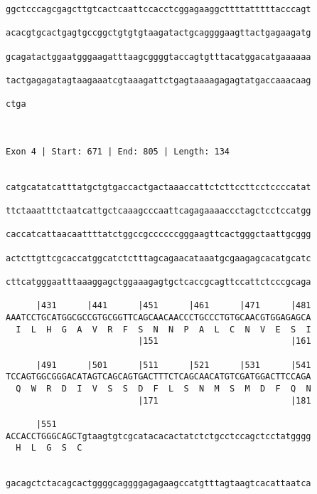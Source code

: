 \documentclass{article}
\begin{document}
\begin{Verbatim}
ggctcccagcgagcttgtcactcaattccacctcggagaaggcttttatttttacccagt
                                                            
acacgtgcactgagtgccggctgtgtgtaagatactgcaggggaagttactgagaagatg
                                                            
gcagatactggaatgggaagatttaagcggggtaccagtgtttacatggacatgaaaaaa
                                                            
tactgagagatagtaagaaatcgtaaagattctgagtaaaagagagtatgaccaaacaag
                                                            
ctga
    
    
 
Exon 4 | Start: 671 | End: 805 | Length: 134


catgcatatcatttatgctgtgaccactgactaaaccattctcttccttcctccccatat
                                                            
ttctaaatttctaatcattgctcaaagcccaattcagagaaaaccctagctcctccatgg
                                                            
caccatcattaacaattttatctggccgccccccgggaagttcactgggctaattgcggg
                                                            
actcttgttcgcaccatggcatctctttagcagaacataaatgcgaagagcacatgcatc
                                                            
cttcatgggaatttaaaggagctggaaagagtgctcaccgcagttccattctcccgcaga
                                                            
      |431      |441      |451      |461      |471      |481
AAATCCTGCATGGCGCCGTGCGGTTCAGCAACAACCCTGCCCTGTGCAACGTGGAGAGCA
  I  L  H  G  A  V  R  F  S  N  N  P  A  L  C  N  V  E  S  I
                          |151                          |161
  
      |491      |501      |511      |521      |531      |541
TCCAGTGGCGGGACATAGTCAGCAGTGACTTTCTCAGCAACATGTCGATGGACTTCCAGA
  Q  W  R  D  I  V  S  S  D  F  L  S  N  M  S  M  D  F  Q  N
                          |171                          |181
  
      |551                                                  
ACCACCTGGGCAGCTgtaagtgtcgcatacacactatctctgcctccagctcctatgggg
  H  L  G  S  C                                             
                                                            
  
gacagctctacagcactggggcaggggagagaagccatgtttagtaagtcacattaatca
                                                            

\end{Verbatim}
\end{document}
